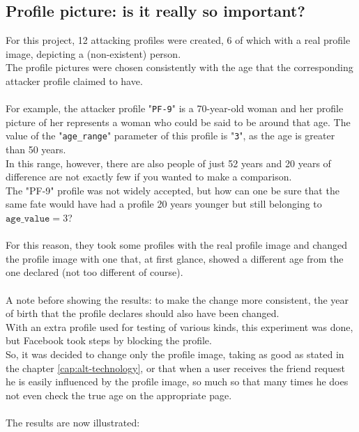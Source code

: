 \subsection{Profile picture: is it really so important?}
\label{cap:discuss-image-profile}
For this project, 12 attacking profiles were created, 6 of which with a real profile image, depicting a (non-existent) person.\\
The profile pictures were chosen consistently with the age that the corresponding attacker profile claimed to have.\\\\For example, the attacker profile "\texttt{PF-9}" is a 70-year-old woman and her profile picture of her represents a woman who could be said to be around that age. The value of the "\texttt{age\_range}" parameter of this profile is "\texttt{3}", as the age is greater than 50 years.\\In this range, however, there are also people of just 52 years and 20 years of difference are not exactly few if you wanted to make a comparison.\\The "PF-9" profile was not widely accepted, but how can one be sure that the same fate would have had a profile 20 years younger but still belonging to $\texttt{age\_value} = 3$?\\\\For this reason, they took some profiles with the real profile image and changed the profile image with one that, at first glance, showed a different age from the one declared (not too different of course).\\\\A note before showing the results: to make the change more consistent, the year of birth that the profile declares should also have been changed.\\With an extra profile used for testing of various kinds, this experiment was done, but Facebook took steps by blocking the profile.\\So, it was decided to change only the profile image, taking as good as stated in the chapter \ref{cap:alt-technology}, or that when a user receives the friend request he is easily influenced by the profile image, so much so that many times he does not even check the true age on the appropriate page.
\\\\The results are now illustrated:
